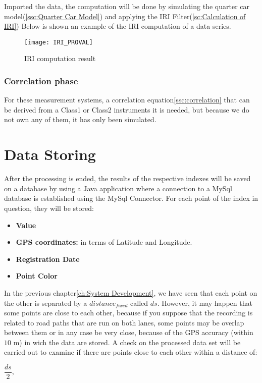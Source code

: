 \documentclass[tesi]{subfiles}
\begin{document}
Imported the data, the computation will be done by simulating the quarter car model(\ref{ssc:Quarter Car Model}) and applying the IRI Filter(\ref{sc:Calculation of IRI})
Below is shown an example of the IRI computation of a data series.
\begin{figure}[H]
\centering
\texttt{[image: IRI\_PROVAL]}
\caption{IRI computation result}
\end{figure}\label{fig:IRI computation result}


\subsubsection{Correlation phase}
For these measurement systems, a correlation equation\ref{ssc:correlation} that can be derived from a Class1 or Class2 instruments it is needed, but because we do not own any of them, it has only been simulated.

\clearpage
\section{Data Storing}\label{sc:data_storing}
After the processing is ended, the results of the respective indexes will be saved on a database by using a Java application where a connection to a MySql database is established using the MySql Connector.
For each point of the index in question, they will be stored:
\begin{itemize}
\item \textbf{Value}
\item \textbf{GPS coordinates:} in terms of Latitude and Longitude.
\item \textbf{Registration Date}
\item \textbf{Point Color}
\end{itemize}
In the previous chapter\ref{ch:System Development}, we have seen that each point on the other is separated by a $distance_{fixed}$ called $ds$. However, it may happen that some points are close to each other, because if you suppose that the recording is related to road paths that are run on both lanes, some points may be overlap between them or in any case be very close, because of the GPS accuracy (within $10$ m) in wich the data are stored. A check on the processed data set will be carried out to examine if there are points close to each other within a distance of:

\begin{center}
$\dfrac{ds}{2}$,
\end{center}
\end{document}
